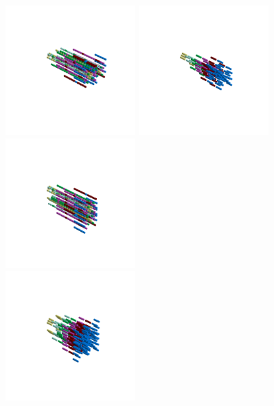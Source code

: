 \begin{minipage}[b]{0.48\linewidth}                                       
  \begin{figure}[H]
      \centering
        \vspace*{-1cm}
        \hspace*{-2cm}
        \includegraphics[width=5cm]{src/symmetries/pattern5_1-45.png}%
        \hspace*{-3cm}
        \includegraphics[width=5cm]{src/symmetries/pattern5_2-45.png}\\
        \vspace*{-3cm}
        \hspace*{-4cm}
        \includegraphics[width=5cm]{src/symmetries/pattern5_3-45.png} \\
        \vspace*{-5cm}
        \includegraphics[width=5cm]{src/symmetries/pattern5_4-45.png}
        \vspace*{-1cm}
  \caption*{}
  \end{figure}
\end{minipage}

